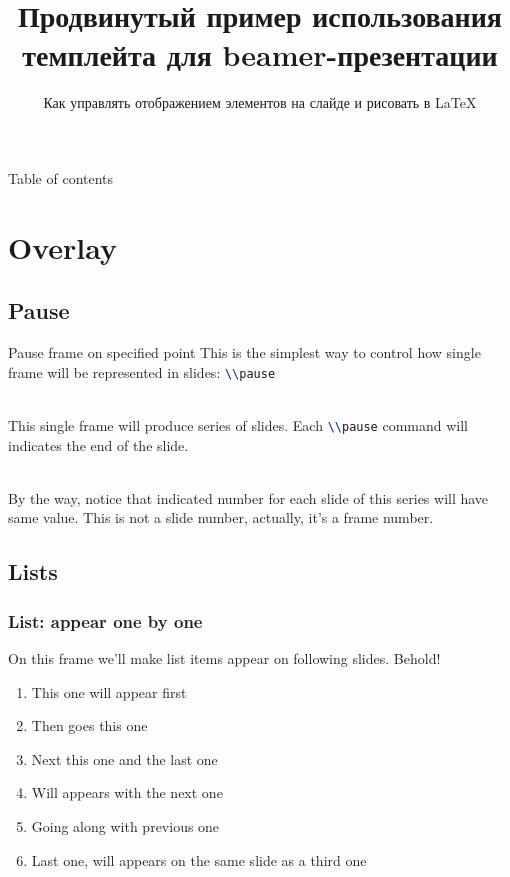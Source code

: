 
\title[bash]{Продвинутый пример использования темплейта для beamer-презентации}
\subtitle{Как управлять отображением элементов на слайде и рисовать в \LaTeX}



\begin{frame}
	\titlepage
\end{frame}

\begin{frame}{Table of contents}
	\tableofcontents
\end{frame}




\section{Overlay}
\subsection{Pause}
\begin{frame}{Pause frame on specified point}
    This is the simplest way to control how single frame will be represented in slides: \lstinline[language=tex]{\\pause}\\~\\\pause

    This single frame will produce series of slides. Each \lstinline[language=tex]{\\pause} command will indicates the end of the slide.\\~\\\pause

    By the way, notice that indicated number for each slide of this series will have same value. This is not a slide number, actually, it's a frame number. 
\end{frame}

\subsection{Lists}
\begin{frame}
    \frametitle{List: appear one by one}
    On this frame we'll make list items appear on following slides. Behold!
    \begin{enumerate}
	\item<1-> This one will appear first
	\item<2-> Then goes this one
	\item<3-> Next this one and the last one
	\item<4-> Will appears with the next one
	\item<4-> Going along with previous one
	\item<3-> Last one, will appears on the same slide as a third one
    \end{enumerate}
\end{frame}

